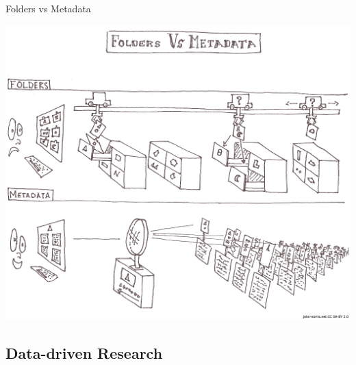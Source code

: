\documentclass[compress,11pt,xcolor=svgnames,aspectratio=169]{beamer}
\begin{document}
\begin{frame}[fragile]{Folders vs Metadata}

\begin{center}
\includegraphics[scale=0.6]{fig/FoldersVsMeta}
\end{center}

\end{frame}

\subsection{Data-driven Research}
\end{document}
